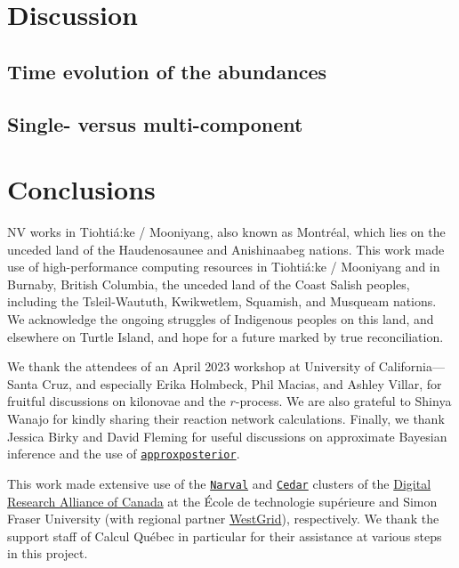 \documentclass[twocolumn, twocolappendix]{aastex63}
\def\approxposterior{\texttt{approxposterior}}
\begin{document}

\section{Discussion}\label{sec:disco}


\subsection{Time evolution of the abundances}


\subsection{Single- versus multi-component}




\section{Conclusions}\label{sec:conco}



\acknowledgments


NV works in Tiohti{\'a}:ke / Mooniyang, also known as Montr{\'e}al, which lies on the unceded land of the Haudenosaunee and Anishinaabeg nations. This work made use of high-performance computing resources in Tiohti{\'a}:ke / Mooniyang and in Burnaby, British Columbia, the unceded land of the Coast Salish peoples, including the Tsleil-Waututh, Kwikwetlem, Squamish, and Musqueam nations. We acknowledge the ongoing struggles of Indigenous peoples on this land, and elsewhere on Turtle Island, and hope for a future marked by true reconciliation. 

We thank the attendees of an April 2023 workshop at University of California---Santa Cruz, and especially Erika Holmbeck, Phil Macias, and Ashley Villar, for fruitful discussions on kilonovae and the $r$-process. We are also grateful to Shinya Wanajo for kindly sharing their reaction network calculations. Finally, we thank Jessica Birky and David Fleming for useful discussions on approximate Bayesian inference and the use of \href{https://dflemin3.github.io/approxposterior/index.html}{\approxposterior}.

This work made extensive use of the \href{https://docs.alliancecan.ca/wiki/Narval/en}{\texttt{Narval}} and \href{https://docs.alliancecan.ca/wiki/Cedar}{\texttt{Cedar}} clusters of the \href{https://alliancecan.ca/en}{Digital Research Alliance of Canada} at the {\'E}cole de technologie sup{\'e}rieure and Simon Fraser University (with regional partner \href{https://www.westgrid.ca/}{WestGrid}), respectively. We thank the support staff of Calcul Qu{\'e}bec in particular for their assistance at various steps in this project. 
\end{document}
